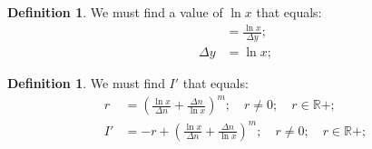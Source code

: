 \documentclass[10pt]{article}
\theoremstyle{plain}
\theoremstyle{definition}
\newtheorem{definition}[theorem]{Definition}
\theoremstyle{remark}
\begin{document}
\begin{definition}
	We must find a value of $\ln x$ that equals:
	\begin{align*}
		&= \frac{\ln x}{\Delta y};\\
		\Delta y &= \ln x;
	\end{align*}
\end{definition}

\begin{definition}
	We must find $I'$ that equals:
	\begin{align*}
		r &= ( \frac{\ln x}{\Delta n} + \frac{\Delta n}{\ln x})^m; \quad r \neq 0; \quad r \in \mathbb{R}{+};\\
		I' &= - r + ( \frac{\ln x}{\Delta n} + \frac{\Delta n}{\ln x})^m; \quad r \neq 0; \quad r \in \mathbb{R}{+};
	\end{align*}
\end{definition}

\nocite{*}



\end{document}
